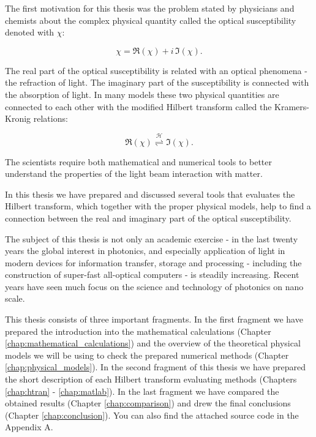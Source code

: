 \documentclass[12pt,twoside,a4paper]{article}
\numberwithin{equation}{subsection}
\numberwithin{figure}{subsection}
\begin{document}
The first motivation for this thesis was the problem stated by physicians and chemists about the complex physical quantity called the optical susceptibility denoted with $\chi$:

\begin{equation} \label{eq:pra_susceptibility}
	\chi = \Re (\chi) + i \, \Im (\chi) . 
\end{equation}

The real part of the optical susceptibility is related with an optical phenomena - the refraction of light. The imaginary part of the susceptibility is connected with the absorption of light. In many models these two physical quantities are connected to each other with the modified Hilbert transform called the Kramers-Kronig relations:


\begin{equation} \label{eq:pra_hilbert_connection} 
	 \Re (\chi)  \overset{\mathcal{H}}{\rightleftharpoons} \Im (\chi) .
\end{equation}

The scientists require both mathematical and numerical tools to better understand the properties of the light beam interaction with matter. 

In this thesis we have prepared and discussed several tools that evaluates the Hilbert transform, which together with the proper physical models, help to find a connection between the real and imaginary part of the optical susceptibility.   

The subject of this thesis is not only an academic exercise - in the last twenty years the global interest in photonics, and especially application of light in modern devices for information transfer, storage and processing - including the construction of super-fast all-optical computers - is steadily increasing. Recent years have seen much focus on the science and technology of photonics on nano scale. 

This thesis consists of three important fragments. In the first fragment we have prepared the introduction into the mathematical calculations (Chapter \ref{chap:mathematical_calculations}) and the overview of the theoretical physical models we will be using to check the prepared numerical methods (Chapter \ref{chap:physical_models}). In the second fragment of this thesis we have prepared the short description of each Hilbert transform evaluating methods (Chapters \ref{chap:htran} - \ref{chap:matlab}). In the last fragment we have compared the obtained results (Chapter \ref{chap:comparison}) and drew the final conclusions (Chapter \ref{chap:conclusion}). You can also find the attached source code in the Appendix A.
\end{document}
